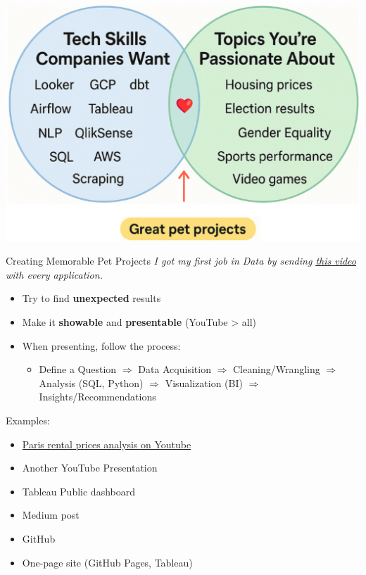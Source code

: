 \documentclass[10pt,a4paper]{article}
\begin{document}
\begin{multicols}{3}
\begin{textboxWhite}{}
\includegraphics[width=\textwidth]{image.png}
\end{textboxWhite}

	
\begin{textboxRed}{Creating Memorable Pet Projects}
\emph{I got my first job in Data by sending \underline{\href{https://www.youtube.com/watch?v=54jvW1ulaP0&t=961s}{this video}} with every application.}

\begin{itemize}
    \item Try to find \textbf{unexpected} results
    \item Make it \textbf{showable} and \textbf{presentable} (YouTube > all)
    \item When presenting, follow the process:
	\begin{itemize}
    \item Define a Question $\Rightarrow$ Data Acquisition $\Rightarrow$ Cleaning/Wrangling $\Rightarrow$ Analysis (SQL, Python) $\Rightarrow$ Visualization (BI) $\Rightarrow$ Insights/Recommendations
	\end{itemize}

\end{itemize}

Examples:
\begin{itemize}
    \item \href{https://youtube.com/watch?v=HKuhMtrEgDE}{Paris rental prices analysis on Youtube}
    \item Another YouTube Presentation
    \item Tableau Public dashboard
    \item Medium post
    \item GitHub
    \item One-page site (GitHub Pages, Tableau)
\end{itemize}


\end{textboxRed}
\end{multicols}
\end{document}
